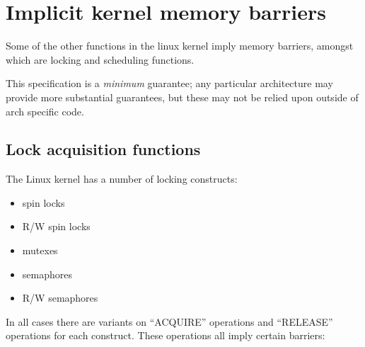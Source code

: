 \section{Implicit kernel memory barriers}

Some of the other functions in the linux kernel imply memory barriers, amongst
which are locking and scheduling functions.

This specification is a \emph{minimum} guarantee; any particular architecture
may provide more substantial guarantees, but these may not be relied upon
outside of arch specific code.


\subsection{Lock acquisition functions}

The Linux kernel has a number of locking constructs:

\begin{itemize}[itemsep=0pt]
 \item spin locks
 \item R/W spin locks
 \item mutexes
 \item semaphores
 \item R/W semaphores
\end{itemize}

In all cases there are variants on ``ACQUIRE'' operations and ``RELEASE'' operations
for each construct.
These operations all imply certain barriers:

